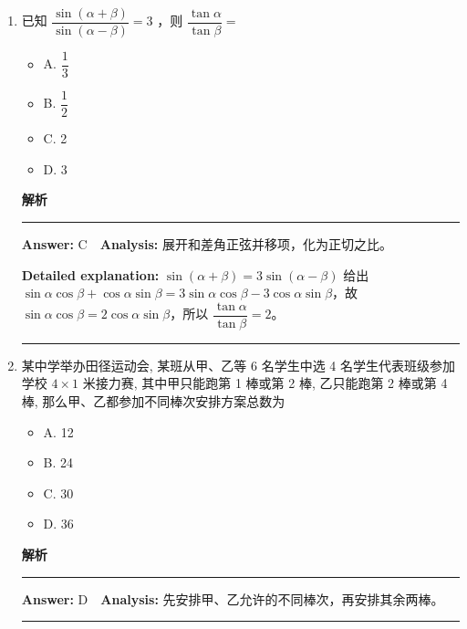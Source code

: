 \documentclass[UTF8,12pt,a4paper]{ctexart}
\newenvironment{examSolutionBox}{%
  \par\medskip\begingroup
  \setlength{\leftskip}{1.0em}\setlength{\rightskip}{0.9em}%
  \noindent\textcolor{SolutionTeal}{\bfseries\large 解析}\par
  \smallskip\noindent\textcolor{SolutionRule}{\rule{\dimexpr\linewidth-\leftskip-\rightskip\relax}{0.8pt}}\par
  \smallskip\color{SolutionInk}%
}{%
  \par\smallskip\noindent\textcolor{SolutionRule}{\rule{\dimexpr\linewidth-\leftskip-\rightskip\relax}{0.8pt}}\par
  \endgroup\medskip
}
\providecommand{\tightlist}{%
  \setlength{\itemsep}{0pt}\setlength{\parskip}{0pt}}
\begin{document}
\begin{enumerate}
  \begin{examSolutionBox}

  \textbf{Answer:} B　\textbf{Analysis:} 分别展开两向量和、差的模的平方。

  \textbf{Detailed explanation:} 由 \(|\vec a-\vec b|^2=|\vec a|^2+|\vec b|^2-2\vec a\cdot\vec b=2\) 得 \(\vec a\cdot\vec b=0\)，故 \(|\vec a+\vec b|^2=2\)，即 \(|\vec a+\vec b|=\sqrt2\)。

  \end{examSolutionBox}
\item
  已知 \(\dfrac{\sin(\alpha+\beta)}{\sin(\alpha-\beta)}=3\) ，则 \(\dfrac{\tan\alpha}{\tan\beta}=\)

  \begin{itemize}
  \tightlist
  \item
    A. \(\dfrac{1}{3}\)
  \item
    B. \(\dfrac{1}{2}\)
  \item
    C. 2
  \item
    D. 3
  \end{itemize}

  \begin{examSolutionBox}

  \textbf{Answer:} C　\textbf{Analysis:} 展开和差角正弦并移项，化为正切之比。

  \textbf{Detailed explanation:} \(\sin(\alpha+\beta)=3\sin(\alpha-\beta)\) 给出
  \(\sin\alpha\cos\beta+\cos\alpha\sin\beta=3\sin\alpha\cos\beta-3\cos\alpha\sin\beta\)，故 \(\sin\alpha\cos\beta=2\cos\alpha\sin\beta\)，所以 \(\dfrac{\tan\alpha}{\tan\beta}=2\)。

  \end{examSolutionBox}
\item
  某中学举办田径运动会, 某班从甲、乙等 6 名学生中选 4 名学生代表班级参加学校 \(4 \times 1\) 米接力赛, 其中甲只能跑第 1 棒或第 2 棒, 乙只能跑第 2 棒或第 4 棒, 那么甲、乙都参加不同棒次安排方案总数为

  \begin{itemize}
  \tightlist
  \item
    A. 12
  \item
    B. 24
  \item
    C. 30
  \item
    D. 36
  \end{itemize}

  \begin{examSolutionBox}

  \textbf{Answer:} D　\textbf{Analysis:} 先安排甲、乙允许的不同棒次，再安排其余两棒。


\end{examSolutionBox}
\end{enumerate}
\end{document}
